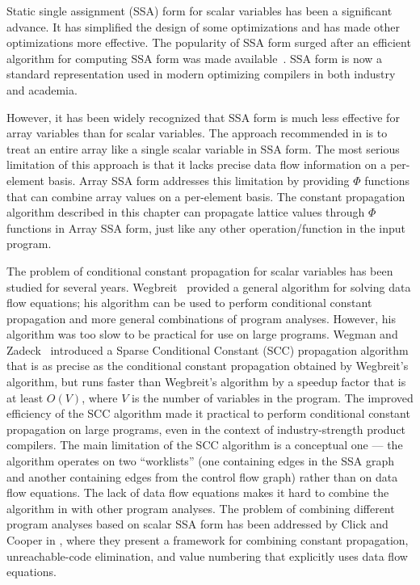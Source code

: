 Static single assignment (SSA) form for scalar variables has been a significant
advance.  It has simplified the design of some optimizations and has made
other optimizations more effective.  
The popularity of SSA form surged
after an efficient algorithm for computing SSA form was made available~\cite{CFRWZ91a}.  SSA form is now a standard representation used in modern
optimizing compilers in both industry and academia.

However, it has been widely recognized that SSA form is much less
effective for array variables than for scalar variables.
The approach recommended in \cite{CFRWZ91a} is to treat an
entire array like a single scalar variable in SSA form.
The most serious limitation of this approach is that it lacks precise
data flow information on a per-element basis.
Array SSA form addresses this limitation by providing $\Phi$
functions that can combine array values on a per-element basis.
The constant propagation algorithm described in this
chapter can  propagate lattice values through $\Phi$ functions 
in Array SSA form,
just
like any other operation/function in the input program.

The problem of conditional constant propagation for 
scalar variables 
has been
studied for several years.  Wegbreit~\cite{Wegb75} provided a general
algorithm for solving data flow equations; his algorithm
can be used to perform conditional constant propagation and
more general combinations of program analyses.
However, his algorithm was too slow to be practical for use on 
large programs.
Wegman and Zadeck~\cite{WeZa91} introduced a Sparse Conditional
Constant (SCC) propagation algorithm that is as precise as the conditional
constant propagation obtained by Wegbreit's algorithm, but runs faster
than Wegbreit's algorithm by a speedup factor that is at least $O(V)$,
where $V$ is the number of variables in the program.  
The improved efficiency of the SCC algorithm made it practical to
perform conditional constant propagation on large programs, even in the
context of industry-strength product compilers.  The main limitation
of the SCC algorithm is a conceptual one --- the algorithm operates
on two ``worklists''
(one containing edges in the SSA graph and another
containing edges from the control flow graph)
rather than on data flow equations.  The lack of
data flow equations
makes it hard to combine the algorithm in \cite{WeZa91}
with other program analyses.
The problem  of combining different program analyses based on
scalar SSA form has been addressed by Click and
Cooper in \cite{ClCo95}, where they present a framework for 
combining constant propagation, unreachable-code elimination,
and value numbering that explicitly uses data flow equations.

